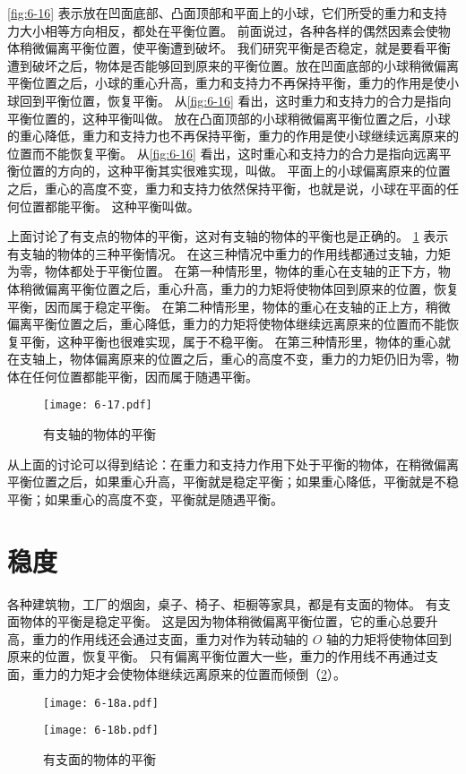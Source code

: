 \cref{fig:6-16} 表示放在凹面底部、凸面顶部和平面上的小球，它们所受的重力和支持力大小相等方向相反，都处在平衡位置。
前面说过，各种各样的偶然因素会使物体稍微偏离平衡位置，使平衡遭到破坏。
我们研究平衡是否稳定，就是要看平衡遭到破坏之后，物体是否能够回到原来的平衡位置。放在凹面底部的小球稍微偏离平衡位置之后，小球的重心升高，重力和支持力不再保持平衡，重力的作用是使小球回到平衡位置，恢复平衡。
从\cref{fig:6-16} 看出，这时重力和支持力的合力是指向平衡位置的，这种平衡叫做。
放在凸面顶部的小球稍微偏离平衡位置之后，小球的重心降低，重力和支持力也不再保持平衡，重力的作用是使小球继续远离原来的位置而不能恢复平衡。
从\cref{fig:6-16} 看出，这时重心和支持力的合力是指向远离平衡位置的方向的，这种平衡其实很难实现，叫做。
平面上的小球偏离原来的位置之后，重心的高度不变，重力和支持力依然保持平衡，也就是说，小球在平面的任何位置都能平衡。
这种平衡叫做。

上面讨论了有支点的物体的平衡，这对有支轴的物体的平衡也是正确的。
\cref{fig:6-17} 表示有支轴的物体的三种平衡情况。
在这三种情况中重力的作用线都通过支轴，力矩为零，物体都处于平衡位置。
在第一种情形里，物体的重心在支轴的正下方，物体稍微偏离平衡位置之后，重心升高，重力的力矩将使物体回到原来的位置，恢复平衡，因而属于稳定平衡。
在第二种情形里，物体的重心在支轴的正上方，稍微偏离平衡位置之后，重心降低，重力的力矩将使物体继续远离原来的位置而不能恢复平衡，这种平衡也很难实现，属于不稳平衡。
在第三种情形里，物体的重心就在支轴上，物体偏离原来的位置之后，重心的高度不变，重力的力矩仍旧为零，物体在任何位置都能平衡，因而属于随遇平衡。
\begin{figure}
  \texttt{[image: 6-17.pdf]}
  \caption{有支轴的物体的平衡}\label{fig:6-17}
\end{figure}

从上面的讨论可以得到结论：在重力和支持力作用下处于平衡的物体，在稍微偏离平衡位置之后，如果重心升高，平衡就是稳定平衡；如果重心降低，平衡就是不稳平衡；如果重心的高度不变，平衡就是随遇平衡。

\section{稳度}
各种建筑物，工厂的烟囱，桌子、椅子、柜橱等家具，都是有支面的物体。
有支面物体的平衡是稳定平衡。
这是因为物体稍微偏离平衡位置，它的重心总要升高，重力的作用线还会通过支面，重力对作为转动轴的 $O$ 轴的力矩将使物体回到原来的位置，恢复平衡。
只有偏离平衡位置大一些，重力的作用线不再通过支面，重力的力矩才会使物体继续远离原来的位置而倾倒（\cref{fig:6-18}）。
\begin{figure}
\begin{minipage}[b]{0.4\linewidth}\centering
  \texttt{[image: 6-18a.pdf]}
  \subcaption{}\label{fig:6-18a}
\end{minipage}
\begin{minipage}[b]{0.4\linewidth}\centering
  \texttt{[image: 6-18b.pdf]}
  \subcaption{}\label{fig:6-18b}
\end{minipage}
\caption{有支面的物体的平衡}\label{fig:6-18}
\end{figure}

